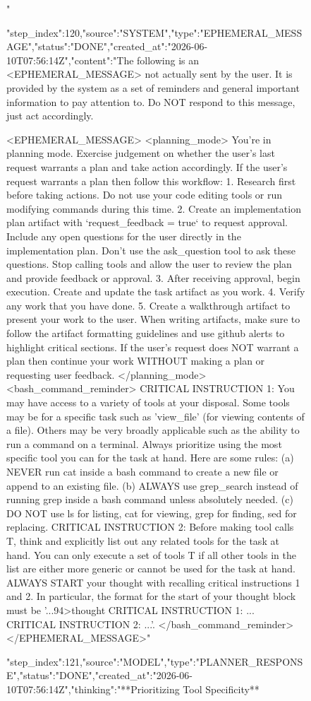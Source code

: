\begin{figure}[htbp]
{"}
{"step_index":120,"source":"SYSTEM","type":"EPHEMERAL_MESSAGE","status":"DONE","created_at":"2026-06-10T07:56:14Z","content":"The following is an <EPHEMERAL_MESSAGE> not actually sent by the user. It is provided by the system as a set of reminders and general important information to pay attention to. Do NOT respond to this message, just act accordingly.

<EPHEMERAL_MESSAGE>
<planning_mode>
You're in planning mode. Exercise judgement on whether the user's last request warrants a plan and take action accordingly.
If the user's request warrants a plan then follow this workflow:
1. Research first before taking actions. Do not use your code editing tools or run modifying commands during this time.
2. Create an implementation plan artifact with `request_feedback = true` to request approval. Include any open questions for the user directly in the implementation plan. Don't use the ask_question tool to ask these questions. Stop calling tools and allow the user to review the plan and provide feedback or approval.
3. After receiving approval, begin execution. Create and update the task artifact as you work.
4. Verify any work that you have done.
5. Create a walkthrough artifact to present your work to the user. When writing artifacts, make sure to follow the artifact formatting guidelines and use github alerts to highlight critical sections.
If the user's request does NOT warrant a plan then continue your work WITHOUT making a plan or requesting user feedback.
</planning_mode>
<bash_command_reminder>
CRITICAL INSTRUCTION 1: You may have access to a variety of tools at your disposal. Some tools may be for a specific task such as 'view_file' (for viewing contents of a file). Others may be very broadly applicable such as the ability to run a command on a terminal. Always prioritize using the most specific tool you can for the task at hand. Here are some rules: (a) NEVER run cat inside a bash command to create a new file or append to an existing file. (b) ALWAYS use grep_search instead of running grep inside a bash command unless absolutely needed. (c) DO NOT use ls for listing, cat for viewing, grep for finding, sed for replacing. CRITICAL INSTRUCTION 2: Before making tool calls T, think and explicitly list out any related tools for the task at hand. You can only execute a set of tools T if all other tools in the list are either more generic or cannot be used for the task at hand. ALWAYS START your thought with recalling critical instructions 1 and 2. In particular, the format for the start of your thought block must be '...94>thought
CRITICAL INSTRUCTION 1: ...
CRITICAL INSTRUCTION 2: ...'.
</bash_command_reminder>
</EPHEMERAL_MESSAGE>"}
{"step_index":121,"source":"MODEL","type":"PLANNER_RESPONSE","status":"DONE","created_at":"2026-06-10T07:56:14Z","thinking":"**Prioritizing Tool Specificity**

}
\end{figure}
